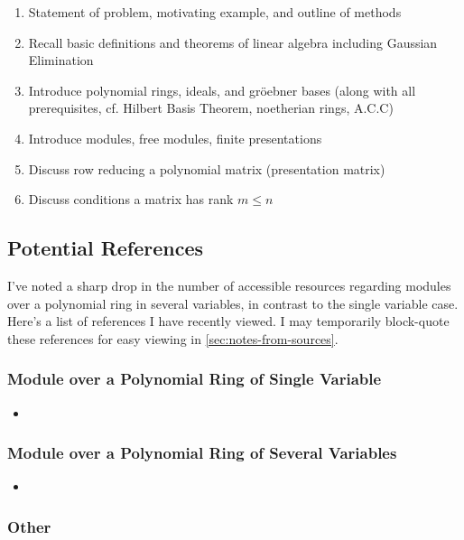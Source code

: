\documentclass{amsart}
\theoremstyle{definition}
\theoremstyle{remark}
\numberwithin{equation}{section}
\begin{document}
\begin{enumerate}
\item Statement of problem, motivating example, and outline of methods
\item Recall basic definitions and theorems of linear algebra including Gaussian Elimination
\item Introduce polynomial rings, ideals, and gr\"oebner bases (along with all prerequisites, cf. Hilbert Basis Theorem, noetherian rings, A.C.C)
\item Introduce modules, free modules, finite presentations
\item Discuss row reducing a polynomial matrix (presentation matrix)
\item Discuss conditions a matrix has rank $m \leq n$
\end{enumerate}

\subsection*{Potential References}

I've noted a sharp drop in the number of accessible resources regarding modules over a polynomial ring in several variables, in contrast to the single variable case. Here's a list of references I have recently viewed. I may temporarily block-quote these references for easy viewing in \cref{sec:notes-from-sources}.

\subsubsection*{Module over a Polynomial Ring of Single Variable}

\begin{itemize}
\item {}
\end{itemize}

\subsubsection*{Module over a Polynomial Ring of Several Variables}

\begin{itemize}
\item {}
\end{itemize}

\subsubsection*{Other}
\end{document}
